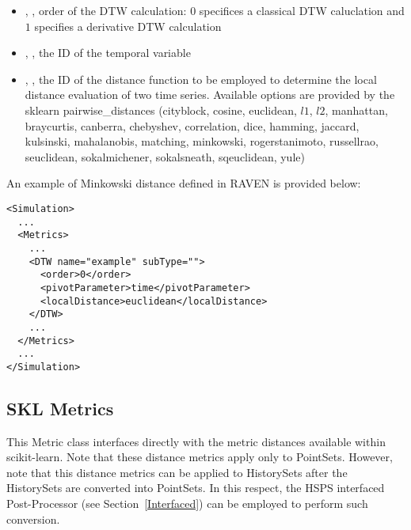 \begin{itemize}
  \item {},          ,    order of the DTW calculation: $0$ specifices a classical DTW caluclation and $1$ specifies 
                                                                    a derivative DTW calculation 
  \item {}, , the ID of the temporal variable
  \item {},  , the ID of the distance function to be employed to determine the local distance 
                                                                    evaluation of two time series. Available options are provided by the sklearn 
                                                                    pairwise\_distances (cityblock, cosine, euclidean, $l1$, $l2$, manhattan,
                                                                    braycurtis, canberra, chebyshev, correlation, dice, hamming, jaccard, 
                                                                    kulsinski, mahalanobis, matching, minkowski, rogerstanimoto, russellrao, 
                                                                    seuclidean, sokalmichener, sokalsneath, sqeuclidean, yule)
\end{itemize}

An example of Minkowski distance defined in RAVEN is provided below:
\begin{lstlisting}[style=XML]
<Simulation> 
  ...
  <Metrics>
    ...
    <DTW name="example" subType="">
      <order>0</order>
      <pivotParameter>time</pivotParameter>
      <localDistance>euclidean</localDistance>
    </DTW>
    ...
  </Metrics>
  ...
</Simulation>
\end{lstlisting}

\subsection{SKL Metrics}
\label{subsection:SKL_metrics}

This Metric class interfaces directly with the metric distances available within scikit-learn.
Note that these distance metrics apply only to PointSets. However, note that this distance metrics can be applied to HistorySets after the HistorySets are converted into PointSets.
In this respect, the HSPS interfaced Post-Processor (see Section~\ref{Interfaced}) can be employed to perform such conversion.

